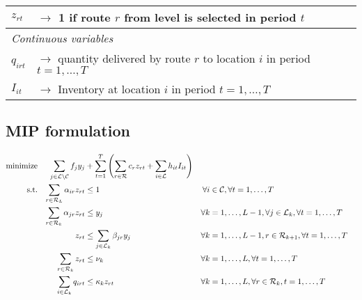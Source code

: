 \documentclass[a4paper,10pt]{article}
\begin{document}
\begin{linenumbers}
\begin{table}
\begin{tabular}{ll}
        $z_{rt}$ & $\rightarrow$ 1 if route $r$ from level is selected in period $t$\\
        \hline
        \multicolumn{2}{l}{\textit{Continuous variables}}\\
        $q_{irt}$ & $\rightarrow$ quantity delivered by route $r$ to location $i$ in period $t=1,\ldots,T$\\
        $I_{it}$ & $\rightarrow$ Inventory at location $i$ in period $t=1,\ldots,T$\\
        \hline
    \end{tabular}
\end{table}

\subsection{MIP formulation}\label{subsection:MIP}
\begin{alignat}{3}
    \text{minimize} &&\sum_{j\in \loc \setminus \cu} f_{j} y_{j} &+\sum_{t=1}^{T} \left( \sum_{r\in \ro} c_r z_{rt} + \sum_{i\in \loc} h_{it} I_{it}\right)\label{objfunct}\\ 
    \text{s.t.}  %
    &&\sum_{r\in \ro_L} \alpha_{ir} z_{rt} &\leq 1 															&\forall i&\in \cu, \forall t=1,\ldots,T  \label{const:singleroutecustomers}\\
&&\sum_{r\in \ro_k} \alpha_{jr} z_{rt} &\leq y_j 															&\forall k&=1,\ldots,L-1, \forall j\in \loc_k, \forall t=1,\ldots,T  \label{const:singleroutedc}\\
&&z_{rt} 					&\leq \sum_{j\in\loc_{k}}\beta_{jr}y_j 													&\forall k&=1,\ldots,L-1,r\in \ro_{k+1}, \forall t=1,\ldots,T\label{const:startfromopendepots}\\
    &&\sum_{r\in \ro_k} z_{rt} &\leq 	\nu_k													&\forall k&=1,\ldots,L, \forall t=1,\ldots,T  \label{const:fleetcapa}\\
    &&\sum_{i\in \loc_k} q_{irt}   		&\leq \kappa_k z_{rt} 														&\forall k&=1,\ldots,L, \forall r\in \ro_k, t=1,\ldots,T\label{const:deliveryUB}\\

\end{alignat}
\end{linenumbers}
\end{document}
